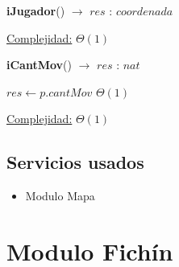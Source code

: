 \documentclass[10pt, a4paper]{article}
\begin{document}
\begin{Algoritmos}
\begin{algorithm}[H]{\textbf{iJugador}() $\to$ $res$ : $coordenada$}
\begin{algorithmic}[1]
                    \medskip
                    \Statex \underline{Complejidad:} $\Theta(1)$
                \end{algorithmic}
        \end{algorithm}

        \begin{algorithm}[H]{\textbf{iCantMov}() $\to$ $res$ : $nat$}
            \begin{algorithmic}[1]
                    \State $res \gets p.cantMov$                                                                \Comment $\Theta(1)$

                    \medskip
                    \Statex \underline{Complejidad:} $\Theta(1)$
                \end{algorithmic}
        \end{algorithm}

    \end{Algoritmos}

    \subsection*{Servicios usados}

        \begin{itemize}
            \item Modulo Mapa
        \end{itemize}

    \newpage

    \section*{Modulo Fichín}
\end{document}
